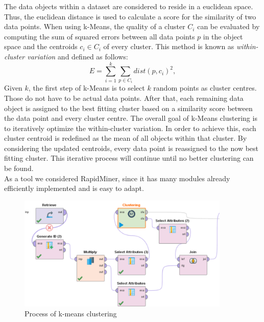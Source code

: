 	The data objects within a dataset are considered to reside in a euclidean space. Thus, the euclidean distance is used to calculate a score for the similarity of two data points. When using k-Means, the quality of a cluster $C_i$ can be evaluated by computing the sum of squared errors between all data points $p$ in the object space and the centroids $c_i \in C_i$ of every cluster. This method is known as \textit{within-cluster variation} \cite{data_mining} and defined as follows: 
	\begin{equation}
		E = \sum_{i=1}^{k} \sum_{p \in C_i} dist(p, c_i)^2,
	\end{equation}
	Given $k$, the first step of k-Means is to select $k$ random points as cluster centres. Those do not have to be actual data points.
	After that, each remaining data object is assigned to the best fitting cluster based on a similarity score between the data point and every cluster centre. The overall goal of k-Means clustering is to iteratively optimize the within-cluster variation. In order to achieve this, each cluster centroid is redefined as the mean of all objects within that cluster. By considering the updated centroids, every data point is reassigned to the now best fitting cluster. This iterative process will continue until no better clustering can be found.\\


	As a tool we considered RapidMiner, since it has many modules already efficiently implemented and is easy to adapt.

	\vspace*{-2em}
	\begin{figure}[H]
		\centering
		\includegraphics[width=0.9\textwidth]{ClusteringRapid.PNG}
		\caption{Process of k-means clustering}
		\label{fig: kclust}
	\end{figure}

